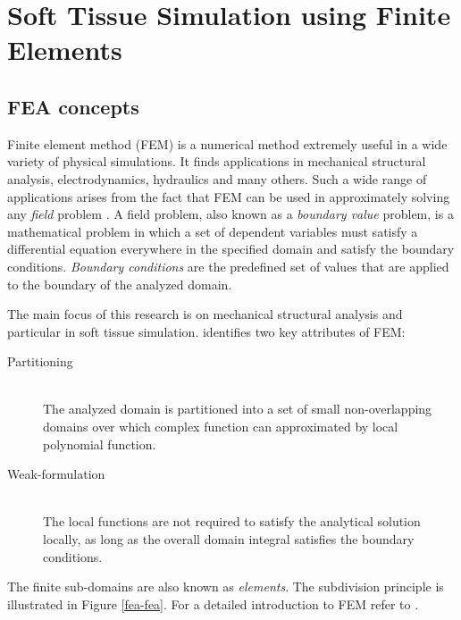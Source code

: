 \section{Soft Tissue Simulation using Finite Elements}\label{methodology-fea}

\subsection{FEA concepts}

Finite element method (FEM) is a numerical method extremely useful in a wide variety of physical simulations. It finds applications in mechanical structural analysis, electrodynamics, hydraulics and many others. Such a wide range of applications arises from the fact that FEM can be used in approximately solving any \textit{field} problem \cite{Hutton2004}. A field problem, also known as a \textit{boundary value} problem, is a mathematical problem in which a set of dependent variables must satisfy a differential equation everywhere in the specified domain and satisfy the boundary conditions. \textit{Boundary conditions} are the predefined set of values that are applied to the boundary of the analyzed domain.

The main focus of this research is on mechanical structural analysis and particular in soft tissue simulation. \cite{Oden:2010} identifies two key attributes of FEM:

\begin{description}

  \item[Partitioning] \hfill \\
  The analyzed domain is partitioned into a set of small non-overlapping domains over which complex function can approximated by local polynomial function.

  \item[Weak-formulation] \hfill \\
  The local functions are not required to satisfy the analytical solution locally, as long as the overall domain integral satisfies the boundary conditions.

\end{description}

The finite sub-domains are also known as \textit{elements}. The subdivision principle is illustrated in Figure \ref{fea-fea}. For a detailed introduction to FEM refer to \cite{Hutton2004}.

